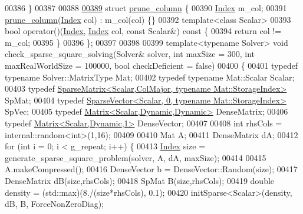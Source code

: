 \begin{DoxyCode}
00386 \}
00387 
00388 
\hyperlink{structprune__column}{00389} \textcolor{keyword}{struct }\hyperlink{structprune__column}{prune\_column} \{
00390   \hyperlink{namespace_eigen_a62e77e0933482dafde8fe197d9a2cfde}{Index} m\_col;
00391   \hyperlink{structprune__column}{prune\_column}(\hyperlink{namespace_eigen_a62e77e0933482dafde8fe197d9a2cfde}{Index} col) : m\_col(col) \{\}
00392   \textcolor{keyword}{template}<\textcolor{keyword}{class} Scalar>
00393   \textcolor{keywordtype}{bool} operator()(\hyperlink{namespace_eigen_a62e77e0933482dafde8fe197d9a2cfde}{Index}, \hyperlink{namespace_eigen_a62e77e0933482dafde8fe197d9a2cfde}{Index} col, \textcolor{keyword}{const} Scalar&)\textcolor{keyword}{ const }\{
00394     \textcolor{keywordflow}{return} col != m\_col;
00395   \}
00396 \};
00397 
00398 
00399 \textcolor{keyword}{template}<\textcolor{keyword}{typename} Solver> \textcolor{keywordtype}{void} check\_sparse\_square\_solving(Solver& solver, \textcolor{keywordtype}{int} maxSize = 300, \textcolor{keywordtype}{int} 
      maxRealWorldSize = 100000, \textcolor{keywordtype}{bool} checkDeficient = \textcolor{keyword}{false})
00400 \{
00401   \textcolor{keyword}{typedef} \textcolor{keyword}{typename} Solver::MatrixType Mat;
00402   \textcolor{keyword}{typedef} \textcolor{keyword}{typename} Mat::Scalar Scalar;
00403   \textcolor{keyword}{typedef} \hyperlink{group___sparse_core___module_class_eigen_1_1_sparse_matrix}{SparseMatrix<Scalar,ColMajor, typename Mat::StorageIndex>}
       SpMat;
00404   \textcolor{keyword}{typedef} \hyperlink{group___sparse_core___module_class_eigen_1_1_sparse_vector}{SparseVector<Scalar, 0, typename Mat::StorageIndex>}
       SpVec;
00405   \textcolor{keyword}{typedef} \hyperlink{group___core___module}{Matrix<Scalar,Dynamic,Dynamic>} DenseMatrix;
00406   \textcolor{keyword}{typedef} \hyperlink{group___core___module}{Matrix<Scalar,Dynamic,1>} DenseVector;
00407 
00408   \textcolor{keywordtype}{int} rhsCols = internal::random<int>(1,16);
00409 
00410   Mat A;
00411   DenseMatrix dA;
00412   \textcolor{keywordflow}{for} (\textcolor{keywordtype}{int} i = 0; i < g\_repeat; i++) \{
00413     \hyperlink{namespace_eigen_a62e77e0933482dafde8fe197d9a2cfde}{Index} size = generate\_sparse\_square\_problem(solver, A, dA, maxSize);
00414 
00415     A.makeCompressed();
00416     DenseVector b = DenseVector::Random(size);
00417     DenseMatrix dB(size,rhsCols);
00418     SpMat B(size,rhsCols);
00419     \textcolor{keywordtype}{double} density = (std::max)(8./(size*rhsCols), 0.1);
00420     initSparse<Scalar>(density, dB, B, ForceNonZeroDiag);

\end{DoxyCode}
